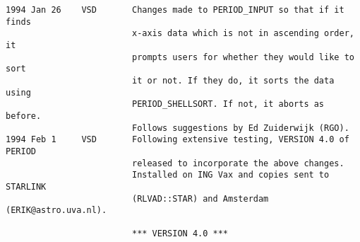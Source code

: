 \begin{verbatim}
1994 Jan 26    VSD       Changes made to PERIOD_INPUT so that if it finds
                         x-axis data which is not in ascending order, it
                         prompts users for whether they would like to sort
                         it or not. If they do, it sorts the data using
                         PERIOD_SHELLSORT. If not, it aborts as before.
                         Follows suggestions by Ed Zuiderwijk (RGO).
1994 Feb 1     VSD       Following extensive testing, VERSION 4.0 of PERIOD 
                         released to incorporate the above changes. 
                         Installed on ING Vax and copies sent to STARLINK 
                         (RLVAD::STAR) and Amsterdam (ERIK@astro.uva.nl).
	                   
                         *** VERSION 4.0 *** 
	                   
\end{verbatim}


\newpage



